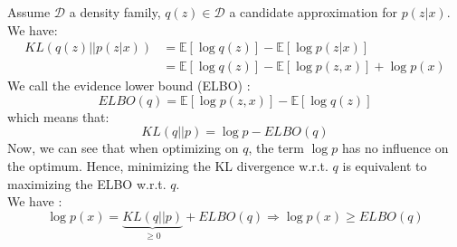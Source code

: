 Assume $\mathcal{D}$ a density family, $q(z) \in \mathcal{D}$ a candidate approximation for $p(z|x)$. We have:
\begin{align}
KL(q(z)||p(z|x)) &= \mathbb{E}\left[\log q(z)\right] - \mathbb{E}\left[\log p(z|x)\right]\\
&= \mathbb{E}\left[\log q(z)\right] - \mathbb{E}\left[\log p(z,x)\right] + \log p(x)
\label{eq:KL_to_logP}
\end{align}
We call the evidence lower bound (ELBO) :
\begin{equation}
ELBO(q) = \mathbb{E}\left[\log p(z,x)\right] - \mathbb{E}\left[\log q(z)\right]
\label{eq:ELBO}
\end{equation}
which means that:
\begin{equation}
KL(q||p) = \log p - ELBO(q)
\label{eq:ELBO-KL}
\end{equation}
Now, we can see that when optimizing on $q$, the term $\log p$ has no influence on the optimum. Hence, minimizing the KL divergence w.r.t. $q$ is equivalent to maximizing the ELBO w.r.t. $q$.\\
\newline
We have :
\begin{equation}
\log p(x) = \underbrace{KL(q||p)}_{\geq 0} + ELBO(q) \Rightarrow \log p(x) \geq ELBO(q)
\label{eq:ELBO+KL}
\end{equation}


